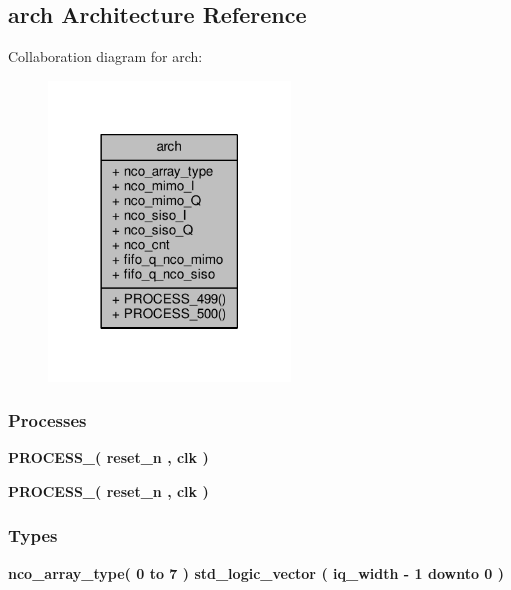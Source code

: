 \subsection{arch Architecture Reference}
\label{classdiq1__test__data_1_1arch}


Collaboration diagram for arch\+:\nopagebreak
\begin{figure}[H]
\begin{center}
\leavevmode
\includegraphics[width=182pt]{d6/df3/classdiq1__test__data_1_1arch__coll__graph}
\end{center}
\end{figure}
\subsubsection*{Processes}
 \begin{DoxyCompactItemize}
\item 
{\bf P\+R\+O\+C\+E\+S\+S\+\_}{\bfseries  ( {\bfseries {\bfseries {\bf reset\+\_\+n}} \textcolor{vhdlchar}{ }} , {\bfseries {\bfseries {\bf clk}} \textcolor{vhdlchar}{ }} )}
\item 
{\bf P\+R\+O\+C\+E\+S\+S\+\_}{\bfseries  ( {\bfseries {\bfseries {\bf reset\+\_\+n}} \textcolor{vhdlchar}{ }} , {\bfseries {\bfseries {\bf clk}} \textcolor{vhdlchar}{ }} )}
\end{DoxyCompactItemize}
\subsubsection*{Types}
 \begin{DoxyCompactItemize}
\item 
{\bfseries {\bf nco\+\_\+array\+\_\+type}{\bfseries \textcolor{vhdlchar}{(}\textcolor{vhdlchar}{ }\textcolor{vhdlchar}{ } \textcolor{vhdldigit}{0} \textcolor{vhdlchar}{ }\textcolor{keywordflow}{to}\textcolor{vhdlchar}{ }\textcolor{vhdlchar}{ } \textcolor{vhdldigit}{7} \textcolor{vhdlchar}{ }\textcolor{vhdlchar}{)}\textcolor{vhdlchar}{ }\textcolor{vhdlchar}{ }\textcolor{comment}{std\+\_\+logic\+\_\+vector}\textcolor{vhdlchar}{ }\textcolor{vhdlchar}{(}\textcolor{vhdlchar}{ }\textcolor{vhdlchar}{ }\textcolor{vhdlchar}{ }\textcolor{vhdlchar}{ }{\bfseries {\bf iq\+\_\+width}} \textcolor{vhdlchar}{-\/}\textcolor{vhdlchar}{ } \textcolor{vhdldigit}{1} \textcolor{vhdlchar}{ }\textcolor{keywordflow}{downto}\textcolor{vhdlchar}{ }\textcolor{vhdlchar}{ } \textcolor{vhdldigit}{0} \textcolor{vhdlchar}{ }\textcolor{vhdlchar}{)}\textcolor{vhdlchar}{ }}} 
\end{DoxyCompactItemize}
